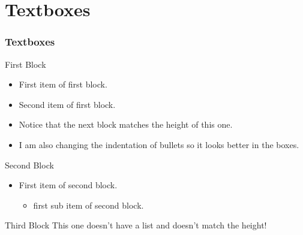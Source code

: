 \documentclass[
	11pt, %
	aspectratio=169, %
]{beamer}
\begin{document}
\section{Textboxes}
\begin{frame}
  \frametitle{Textboxes}
  \centering
  \begin{minipage}{0.3\linewidth}
    \begin{primaryblock}[equal height group=A]{First Block}
    \setlength{\leftmargini}{8pt}
    \begin{itemize}
      \item First item of first block.
      \item Second item of first block.
      \item Notice that the next block matches the height of this one.
      \item I am also changing the indentation of bullets so it looks better in the boxes.
    \end{itemize}
    \end{primaryblock}
  \end{minipage}
  \begin{minipage}{0.3\linewidth}
    \begin{secondaryblock}[equal height group=A]{Second Block}
      \setlength{\leftmargini}{8pt}
      \begin{itemize}
        \item First item of second block.
        \begin{itemize}
          \item first sub item of second block.
        \end{itemize}
      \end{itemize}
    \end{secondaryblock}
  \end{minipage}
  \begin{minipage}{0.3\linewidth}
    \begin{primaryblock}[]{Third Block}
        This one doesn't have a list and doesn't match the height!
    \end{primaryblock}
  \end{minipage}
\end{frame}
\end{document}
